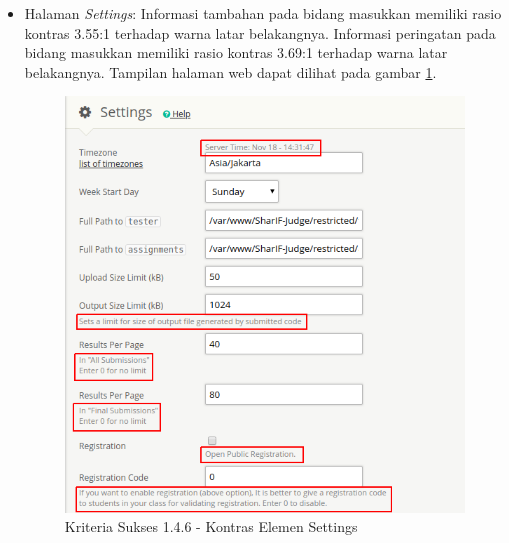 \documentclass[a4paper,twoside]{article}
\begin{document}
\begin{enumerate}
\begin{itemize}
			\item Halaman \textit{Settings}: Informasi tambahan pada bidang masukkan memiliki rasio kontras 3.55:1 terhadap warna latar belakangnya. Informasi peringatan pada bidang masukkan memiliki rasio kontras 3.69:1 terhadap warna latar belakangnya. Tampilan halaman web dapat dilihat pada gambar \ref{fig:kepatuhan_1_4_6_settings}.
			\begin{figure}[H]
				\centering  
				\includegraphics[scale=0.5]{kepatuhan_1_4_6_settings}  
				\caption[Kriteria Sukses 1.4.6 - Kontras Elemen Settings]{Kriteria Sukses 1.4.6 - Kontras Elemen Settings} 
				\label{fig:kepatuhan_1_4_6_settings} 
			\end{figure}
			

\end{itemize}
\end{enumerate}
\end{document}
